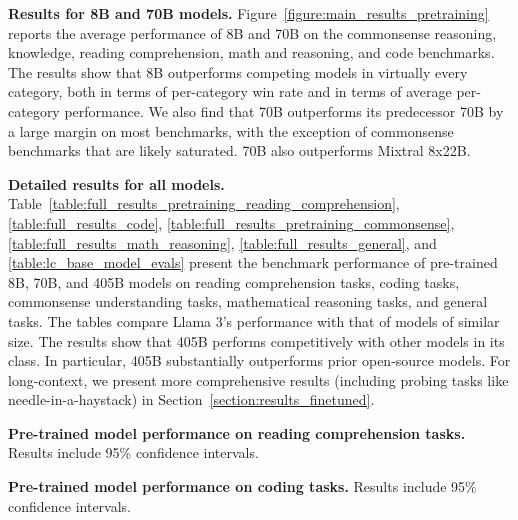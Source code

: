 \textbf{Results for 8B and 70B models.} 
Figure~\ref{figure:main_results_pretraining} reports the average performance of \llamathree 8B and 70B on the commonsense reasoning, knowledge, reading comprehension, math and reasoning, and code benchmarks.
The results show that \llamathree 8B outperforms competing models in virtually every category, both in terms of per-category win rate and in terms of average per-category performance.
We also find that \llamathree 70B outperforms its predecessor \llamatwo 70B by a large margin on most benchmarks, with the exception of commonsense benchmarks that are likely saturated.
\llamathree 70B also outperforms Mixtral 8x22B.

\textbf{Detailed results for all models.} 
Table~\ref{table:full_results_pretraining_reading_comprehension}, \ref{table:full_results_code}, \ref{table:full_results_pretraining_commonsense}, \ref{table:full_results_math_reasoning}, \ref{table:full_results_general}, and \ref{table:lc_base_model_evals} present the benchmark performance of pre-trained \llamathree 8B, 70B, and 405B models on reading comprehension tasks, coding tasks, commonsense understanding tasks, mathematical reasoning tasks, and general tasks.
The tables compare Llama 3's performance with that of models of similar size.
The results show that \llamathree 405B performs competitively with other models in its class. 
In particular, \llamathree 405B substantially outperforms prior open-source models.
For long-context, we present more comprehensive results (including probing tasks like needle-in-a-haystack) in Section~\ref{section:results_finetuned}.




\begin{table}
    \centering
    \begin{minipage}{.48\textwidth}
    
    \caption{\textbf{Pre-trained model performance on reading comprehension tasks.} Results include 95\% confidence intervals.}
    \label{table:full_results_pretraining_reading_comprehension}
    \end{minipage}\hfill
    \begin{minipage}{.48\textwidth}
    \centering
    
    \caption{\textbf{Pre-trained model performance on coding tasks.} Results include 95\% confidence intervals.}
    \label{table:full_results_code}
    \end{minipage}
\end{table}

